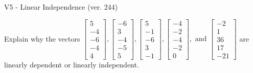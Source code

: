 \begin{exercise}
  \begin{exerciseTitle}V5 - Linear Independence (ver. 244)\end{exerciseTitle}
  \begin{exerciseStatement}
    Explain why the vectors \(\left[\begin{array}{r}
5 \\
-4 \\
-6 \\
-4 \\
4
\end{array}\right] , \left[\begin{array}{r}
-6 \\
3 \\
-4 \\
-5 \\
5
\end{array}\right] , \left[\begin{array}{r}
5 \\
-1 \\
-6 \\
3 \\
-1
\end{array}\right] , \left[\begin{array}{r}
-4 \\
-2 \\
-4 \\
-2 \\
0
\end{array}\right] , \text{ and } \left[\begin{array}{r}
-2 \\
1 \\
36 \\
17 \\
-21
\end{array}\right]\) are linearly dependent or linearly independent.	



\end{exerciseStatement}
\end{exercise}
